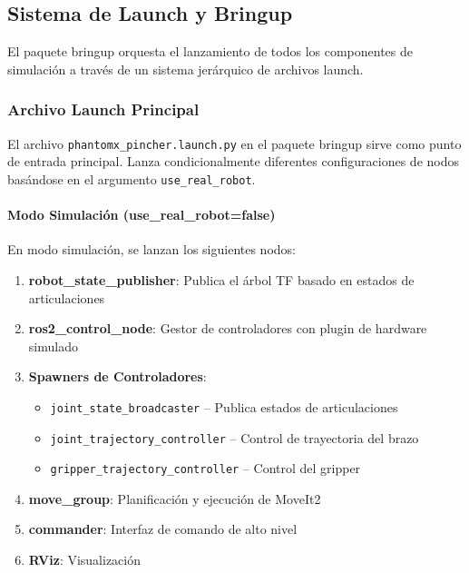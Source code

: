 \subsection{Sistema de Launch y Bringup}

El paquete bringup orquesta el lanzamiento de todos los componentes de simulación a través de un sistema jerárquico de archivos launch.

\subsubsection{Archivo Launch Principal}

El archivo \texttt{phantomx\_pincher.launch.py} en el paquete bringup sirve como punto de entrada principal. Lanza condicionalmente diferentes configuraciones de nodos basándose en el argumento \texttt{use\_real\_robot}.

\paragraph{Modo Simulación (use\_real\_robot=false)}

En modo simulación, se lanzan los siguientes nodos:

\begin{enumerate}
    \item \textbf{robot\_state\_publisher}: Publica el árbol TF basado en estados de articulaciones
    \item \textbf{ros2\_control\_node}: Gestor de controladores con plugin de hardware simulado
    \item \textbf{Spawners de Controladores}:
    \begin{itemize}
        \item \texttt{joint\_state\_broadcaster} -- Publica estados de articulaciones
        \item \texttt{joint\_trajectory\_controller} -- Control de trayectoria del brazo
        \item \texttt{gripper\_trajectory\_controller} -- Control del gripper
    \end{itemize}
    \item \textbf{move\_group}: Planificación y ejecución de MoveIt2
    \item \textbf{commander}: Interfaz de comando de alto nivel
    \item \textbf{RViz}: Visualización
\end{enumerate}

